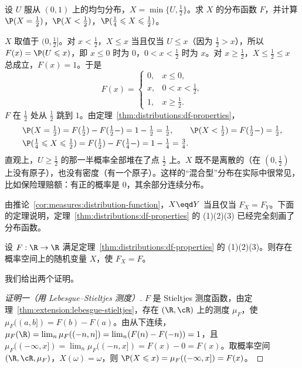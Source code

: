 \begin{workedexample}\label{we:distributions:mixed}
设 $U$ 服从 $(0,1)$ 上的均匀分布，$X=\min\{U,\frac12\}$。求 $X$ 的分布函数 $F$，并计算 $\P(X=\frac12)$，$\P(X<\frac12)$，$\P(\frac14\leqslant X\leqslant\frac12)$。
\end{workedexample}
\begin{solution}
$X$ 取值于 $(0,\frac12]$。对 $x<\frac12$，$X\leqslant x$ 当且仅当 $U\leqslant x$（因为 $\frac12>x$），所以 $F(x)=\P(U\leqslant x)$，即 $x\leqslant0$ 时为 $0$，$0<x<\frac12$ 时为 $x$。对 $x\geqslant\frac12$，$X\leqslant\frac12\leqslant x$ 总成立，$F(x)=1$。于是
\[
F(x)=\begin{cases}0,&x\leqslant0,\\ x,&0<x<\frac12,\\ 1,&x\geqslant\frac12.\end{cases}
\]
$F$ 在 $\frac12$ 处从 $\frac12$ 跳到 $1$。由定理~\ref{thm:distributions:df-properties}，
\[
\begin{aligned}
&\P(X=\tfrac12)=F(\tfrac12)-F(\tfrac12-)=1-\tfrac12=\tfrac12,\qquad \P(X<\tfrac12)=F(\tfrac12-)=\tfrac12,\\
&\P(\tfrac14\leqslant X\leqslant\tfrac12)=F(\tfrac12)-F(\tfrac14-)=1-\tfrac14=\tfrac34 .
\end{aligned}
\]
直观上，$U\geqslant\frac12$ 的那一半概率全部堆在了点 $\frac12$ 上。$X$ 既不是离散的（在 $(0,\frac12)$ 上没有原子），也没有密度（有一个原子）。这样的“混合型”分布在实际中很常见，比如保险理赔额：有正的概率是 $0$，其余部分连续分布。
\end{solution}

由推论~\ref{cor:measures:distribution-function}，$X\eqd Y$ 当且仅当 $F_X=F_Y$。下面的定理说明，定理~\ref{thm:distributions:df-properties} 的 (1)(2)(3) 已经完全刻画了分布函数。

\begin{theorem}[分布函数的刻画]\label{thm:distributions:characterization}
设 $F:\R\to\R$ 满足定理~\ref{thm:distributions:df-properties} 的 (1)(2)(3)。则存在概率空间上的随机变量 $X$，使 $F_X=F$。
\end{theorem}

我们给出两个证明。

\begin{proof}[证明一（用 Lebesgue--Stieltjes 测度）]
$F$ 是 Stieltjes 测度函数，由定理~\ref{thm:extension:lebesgue-stieltjes}，存在 $(\R,\cR)$ 上的测度 $\mu_F$，使 $\mu_F((a,b])=F(b)-F(a)$。由从下连续，$\mu_F(\R)=\lim_n\mu_F((-n,n])=\lim_n(F(n)-F(-n))=1$，且 $\mu_F((-\infty,x])=\lim_n\mu_F((-n,x])=F(x)-0=F(x)$。取概率空间 $(\R,\cR,\mu_F)$，$X(\omega)=\omega$，则 $\P(X\leqslant x)=\mu_F((-\infty,x])=F(x)$。
\end{proof}

